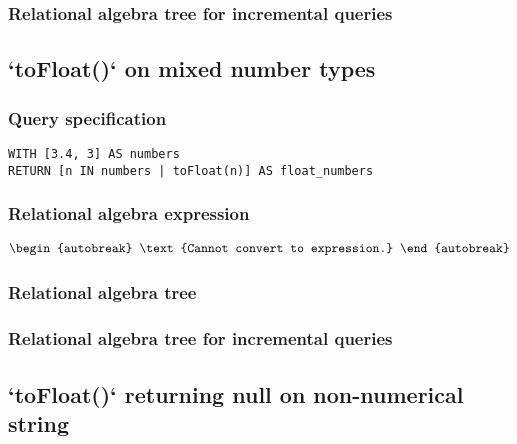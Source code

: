 \subsubsection*{Relational algebra tree for incremental queries}


\subsection{`toFloat()` on mixed number types}

\subsubsection*{Query specification}

\begin{lstlisting}
WITH [3.4, 3] AS numbers
RETURN [n IN numbers | toFloat(n)] AS float_numbers
\end{lstlisting}

\subsubsection*{Relational algebra expression}

\begin{align*}
\begin{autobreak}
\text{Cannot convert to expression.}
\end{autobreak}
\end{align*}

\subsubsection*{Relational algebra tree}


\subsubsection*{Relational algebra tree for incremental queries}


\subsection{`toFloat()` returning null on non-numerical string}

